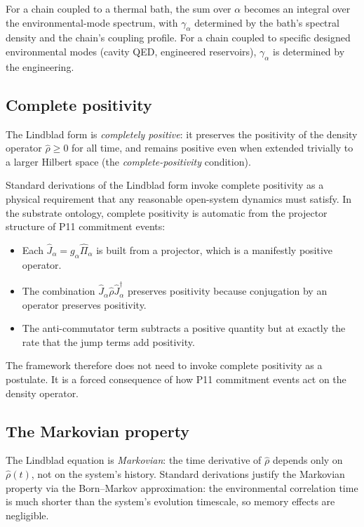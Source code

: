\documentclass[11pt,a4paper]{article}
\begin{document}
For a chain coupled to a thermal bath, the sum over $\alpha$ becomes an integral over the environmental-mode spectrum, with $\gamma_\alpha$ determined by the bath's spectral density and the chain's coupling profile. For a chain coupled to specific designed environmental modes (cavity QED, engineered reservoirs), $\gamma_\alpha$ is determined by the engineering.

\subsection{Complete positivity}

The Lindblad form is \emph{completely positive}: it preserves the positivity of the density operator $\hat\rho \geq 0$ for all time, and remains positive even when extended trivially to a larger Hilbert space (the \emph{complete-positivity} condition).

Standard derivations of the Lindblad form invoke complete positivity as a physical requirement that any reasonable open-system dynamics must satisfy. In the substrate ontology, complete positivity is automatic from the projector structure of P11 commitment events:

\begin{itemize}[noitemsep]
  \item Each $\hat J_\alpha = g_\alpha\hat\Pi_\alpha$ is built from a projector, which is a manifestly positive operator.
  \item The combination $\hat J_\alpha\hat\rho\hat J_\alpha^\dagger$ preserves positivity because conjugation by an operator preserves positivity.
  \item The anti-commutator term subtracts a positive quantity but at exactly the rate that the jump terms add positivity.
\end{itemize}

The framework therefore does not need to invoke complete positivity as a postulate. It is a forced consequence of how P11 commitment events act on the density operator.

\subsection{The Markovian property}

The Lindblad equation is \emph{Markovian}: the time derivative of $\hat\rho$ depends only on $\hat\rho(t)$, not on the system's history. Standard derivations justify the Markovian property via the Born--Markov approximation: the environmental correlation time is much shorter than the system's evolution timescale, so memory effects are negligible.
\end{document}
